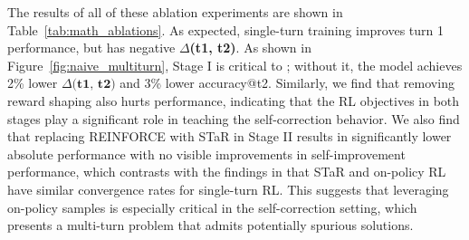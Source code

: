 The results of all of these ablation experiments are shown in  Table~\ref{tab:math_ablations}. As expected, single-turn training improves turn 1 performance, but has negative \textbf{$\Delta$(t1, t2)}. As shown in Figure~\ref{fig:naive_multiturn}, Stage I is critical to \methodname{}; without it, the model achieves 2\% lower $\textbf{$\Delta$(t1, t2)}$ and 3\% lower accuracy@t2. Similarly, we find that removing reward shaping also hurts performance, indicating that the RL objectives in both stages play a significant role in teaching the self-correction behavior. We also find that replacing REINFORCE with STaR in Stage II results in significantly lower absolute performance with no visible improvements in self-improvement performance, which contrasts with the findings in \cite{havrilla2024teaching} that STaR and on-policy RL have similar convergence rates for single-turn RL. This suggests that leveraging on-policy samples is especially critical in the self-correction setting, which presents a multi-turn problem that admits potentially spurious solutions.







